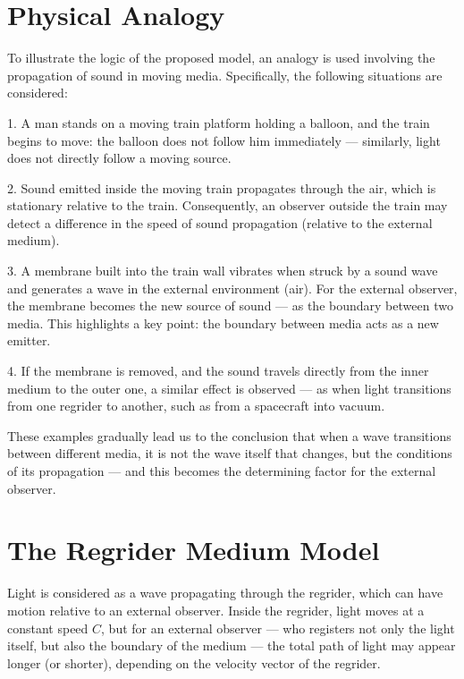 \documentclass[12pt]{article}
\begin{document}
\section*{Physical Analogy}

To illustrate the logic of the proposed model, an analogy is used involving the propagation of sound in moving media. Specifically, the following situations are considered:

\par
1. A man stands on a moving train platform holding a balloon, and the train begins to move: the balloon does not follow him immediately — similarly, light does not directly follow a moving source.
\par
2. Sound emitted inside the moving train propagates through the air, which is stationary relative to the train. Consequently, an observer outside the train may detect a difference in the speed of sound propagation (relative to the external medium).
\par
3. A membrane built into the train wall vibrates when struck by a sound wave and generates a wave in the external environment (air). For the external observer, the membrane becomes the new source of sound — as the boundary between two media. This highlights a key point: the boundary between media acts as a new emitter.
\par
4. If the membrane is removed, and the sound travels directly from the inner medium to the outer one, a similar effect is observed — as when light transitions from one regrider to another, such as from a spacecraft into vacuum.
\par
These examples gradually lead us to the conclusion that when a wave transitions between different media, it is not the wave itself that changes, but the conditions of its propagation — and this becomes the determining factor for the external observer.


\section*{The Regrider Medium Model}

Light is considered as a wave propagating through the regrider, which can have motion relative to an external observer. Inside the regrider, light moves at a constant speed $C$, but for an external observer — who registers not only the light itself, but also the boundary of the medium — the total path of light may appear longer (or shorter), depending on the velocity vector of the regrider.
\end{document}
